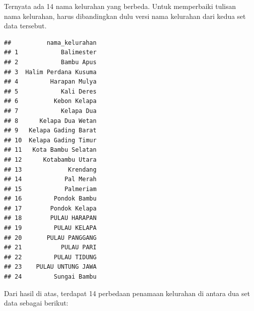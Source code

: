 \documentclass[openany]{book}
\newenvironment{Shaded}{\begin{snugshade}}{\end{snugshade}}
\newcommand{\KeywordTok}[1]{\textcolor[rgb]{0.13,0.29,0.53}{\textbf{#1}}}
\newcommand{\DataTypeTok}[1]{\textcolor[rgb]{0.13,0.29,0.53}{#1}}
\newcommand{\StringTok}[1]{\textcolor[rgb]{0.31,0.60,0.02}{#1}}
\newcommand{\CommentTok}[1]{\textcolor[rgb]{0.56,0.35,0.01}{\textit{#1}}}
\newcommand{\OtherTok}[1]{\textcolor[rgb]{0.56,0.35,0.01}{#1}}
\newcommand{\OperatorTok}[1]{\textcolor[rgb]{0.81,0.36,0.00}{\textbf{#1}}}
\newcommand{\NormalTok}[1]{#1}
\begin{document}
Ternyata ada 14 nama kelurahan yang berbeda. Untuk memperbaiki tulisan
nama kelurahan, harus dibandingkan dulu versi nama kelurahan dari kedua
set data tersebut.

\begin{Shaded}
\end{Shaded}

\begin{verbatim}
##          nama_kelurahan
## 1            Balimester
## 2            Bambu Apus
## 3  Halim Perdana Kusuma
## 4         Harapan Mulya
## 5            Kali Deres
## 6          Kebon Kelapa
## 7            Kelapa Dua
## 8      Kelapa Dua Wetan
## 9   Kelapa Gading Barat
## 10  Kelapa Gading Timur
## 11   Kota Bambu Selatan
## 12      Kotabambu Utara
## 13             Krendang
## 14            Pal Merah
## 15            Palmeriam
## 16         Pondok Bambu
## 17        Pondok Kelapa
## 18        PULAU HARAPAN
## 19         PULAU KELAPA
## 20       PULAU PANGGANG
## 21           PULAU PARI
## 22         PULAU TIDUNG
## 23    PULAU UNTUNG JAWA
## 24         Sungai Bambu
\end{verbatim}

Dari hasil di atas, terdapat 14 perbedaan penamaan kelurahan di antara
dua set data sebagai berikut:
\end{document}
